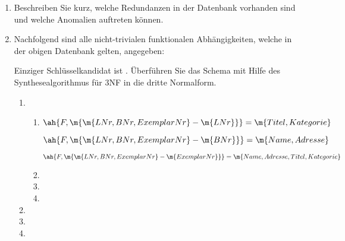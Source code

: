 \documentclass{lehramt-informatik-aufgabe}
\begin{document}
\begin{enumerate}
\item Beschreiben Sie kurz, welche Redundanzen in der Datenbank vorhanden sind
und welche Anomalien auftreten können.

\item Nachfolgend sind alle nicht-trivialen funktionalen Abhängigkeiten,
welche in der obigen Datenbank gelten, angegeben:





Einziger Schlüsselkandidat ist . Überführen Sie
das Schema mit Hilfe des Synthesealgorithmus für 3NF in die dritte
Normalform.

\begin{liAntwort}
\begin{enumerate}
\item {}

\begin{enumerate}
\item {}

$\ah{F, \m{\m{LNr, BNr, ExemplarNr} - \m{LNr}}} = \m{Titel, Kategorie}$

$\ah{F, \m{\m{LNr, BNr, ExemplarNr} - \m{BNr}}} = \m{Name, Adresse}$

$\ah{F, \m{\m{LNr, BNr, ExemplarNr} - \m{ExemplarNr}}} = \m{Name, Adresse, Titel, Kategorie}$


\item {}
\item {}
\item {}
\end{enumerate}

\item {}
\item {}
\item {}
\end{enumerate}
\end{liAntwort}

\end{enumerate}
\end{document}

